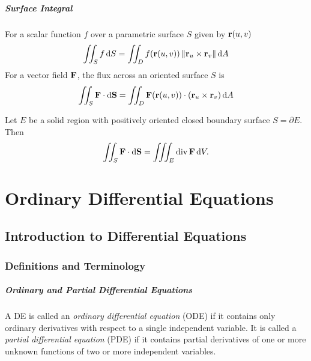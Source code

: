 \documentclass[oneside]{book}
\begin{document}
\paragraph{Surface Integral}
For a scalar function $f$ over a parametric surface $S$ given by $\mathbf{r}(u,v)$
\[
    \iint_S f\mathop{}\!\mathrm{d} S
    =\iint_D f(\mathbf{r}(u,v))\left\lVert \mathbf{r}_u\times\mathbf{r}_v \right\rVert\mathop{}\!\mathrm{d} A
\]
For a vector field $\mathbf{F}$, the flux across an oriented surface $S$ is
\[
    \iint_S \mathbf{F}\cdot \mathop{}\!\mathrm{d}\mathbf{S}
    =\iint_D \mathbf{F}(\mathbf{r}(u,v))\cdot(\mathbf{r}_u\times\mathbf{r}_v)\mathop{}\!\mathrm{d} A
\]

\begin{theorem}
Let $E$ be a solid region with positively oriented closed boundary surface $S=\partial E$. Then
\[
    \iint_S \mathbf{F}\cdot\mathop{}\!\mathrm{d}\mathbf{S}
    =\iiint_E \operatorname{div} \mathbf{F}\mathop{}\!\mathrm{d} V.
\]
\end{theorem}







\chapter{Ordinary Differential Equations}

\section{Introduction to Differential Equations}

\subsection{Definitions and Terminology}


\paragraph{Ordinary and Partial Differential Equations}{
    A DE is called an \emph{ordinary differential equation}
    (ODE) if it contains only ordinary derivatives with respect to a single
    independent variable. It is called a \emph{partial differential equation}
    (PDE) if it contains partial derivatives of one or more unknown functions of
    two or more independent variables.
}
\end{document}
